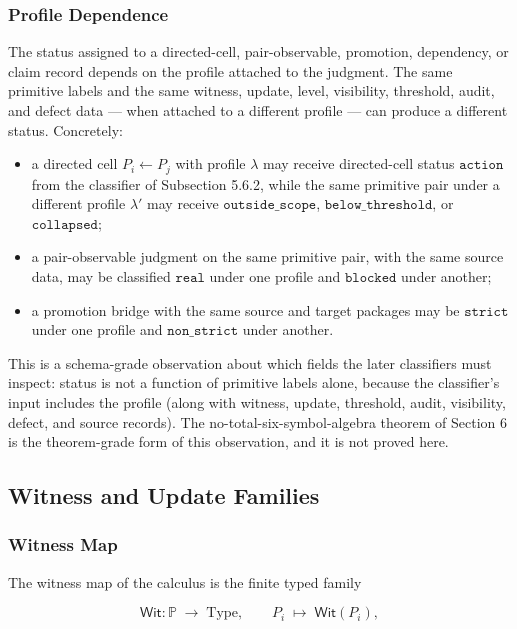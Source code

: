\documentclass[11pt]{article}
\providecommand{\tightlist}{}
\theoremstyle{definition}
\begin{document}
\subsubsection{Profile Dependence}

The status assigned to a directed-cell, pair-observable, promotion, dependency, or claim record depends on the profile attached to the judgment. The same primitive labels and the same witness, update, level, visibility, threshold, audit, and defect data --- when attached to a different profile --- can produce a different status. Concretely:

\begin{itemize}
\tightlist
\item
  a directed cell \(P_i\leftarrow P_j\) with profile \(\lambda\) may receive directed-cell status \(\texttt{action}\) from the classifier of Subsection 5.6.2, while the same primitive pair under a different profile \(\lambda'\) may receive \(\texttt{outside\_scope}\), \(\texttt{below\_threshold}\), or \(\texttt{collapsed}\);
\item
  a pair-observable judgment on the same primitive pair, with the same source data, may be classified \(\texttt{real}\) under one profile and \(\texttt{blocked}\) under another;
\item
  a promotion bridge with the same source and target packages may be \(\texttt{strict}\) under one profile and \(\texttt{non\_strict}\) under another.
\end{itemize}

This is a schema-grade observation about which fields the later classifiers must inspect: status is not a function of primitive labels alone, because the classifier's input includes the profile (along with witness, update, threshold, audit, visibility, defect, and source records). The no-total-six-symbol-algebra theorem of Section 6 is the theorem-grade form of this observation, and it is not proved here.

\subsection{Witness and Update Families}

\subsubsection{Witness Map}

The witness map of the calculus is the finite typed family

\[
\mathsf{Wit}\colon\mathbb P\;\to\;\mathrm{Type},\qquad P_i\;\mapsto\;\mathsf{Wit}(P_i),
\]
\end{document}

